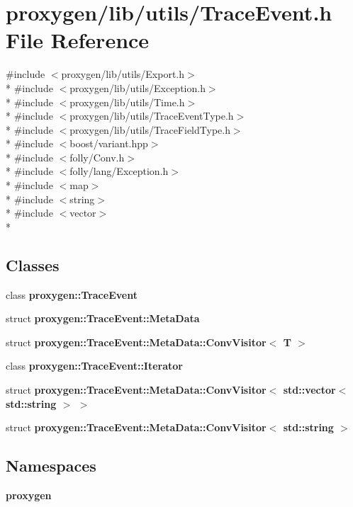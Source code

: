 \section{proxygen/lib/utils/\+Trace\+Event.h File Reference}
\label{TraceEvent_8h}
{\ttfamily \#include $<$proxygen/lib/utils/\+Export.\+h$>$}\\*
{\ttfamily \#include $<$proxygen/lib/utils/\+Exception.\+h$>$}\\*
{\ttfamily \#include $<$proxygen/lib/utils/\+Time.\+h$>$}\\*
{\ttfamily \#include $<$proxygen/lib/utils/\+Trace\+Event\+Type.\+h$>$}\\*
{\ttfamily \#include $<$proxygen/lib/utils/\+Trace\+Field\+Type.\+h$>$}\\*
{\ttfamily \#include $<$boost/variant.\+hpp$>$}\\*
{\ttfamily \#include $<$folly/\+Conv.\+h$>$}\\*
{\ttfamily \#include $<$folly/lang/\+Exception.\+h$>$}\\*
{\ttfamily \#include $<$map$>$}\\*
{\ttfamily \#include $<$string$>$}\\*
{\ttfamily \#include $<$vector$>$}\\*
\subsection*{Classes}
\begin{DoxyCompactItemize}
\item 
class {\bf proxygen\+::\+Trace\+Event}
\item 
struct {\bf proxygen\+::\+Trace\+Event\+::\+Meta\+Data}
\item 
struct {\bf proxygen\+::\+Trace\+Event\+::\+Meta\+Data\+::\+Conv\+Visitor$<$ T $>$}
\item 
class {\bf proxygen\+::\+Trace\+Event\+::\+Iterator}
\item 
struct {\bf proxygen\+::\+Trace\+Event\+::\+Meta\+Data\+::\+Conv\+Visitor$<$ std\+::vector$<$ std\+::string $>$ $>$}
\item 
struct {\bf proxygen\+::\+Trace\+Event\+::\+Meta\+Data\+::\+Conv\+Visitor$<$ std\+::string $>$}
\end{DoxyCompactItemize}
\subsection*{Namespaces}
\begin{DoxyCompactItemize}
\item 
 {\bf proxygen}
\end{DoxyCompactItemize}
